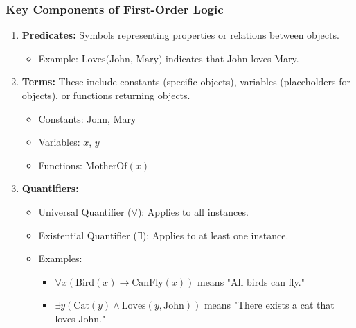 \documentclass[aspectratio=169]{beamer}
\begin{document}
\begin{frame}[fragile]
  \frametitle{Key Components of First-Order Logic}
  
  \begin{enumerate}
    \item \textbf{Predicates:} Symbols representing properties or relations between objects.
      \begin{itemize}
        \item Example: $\text{Loves(John, Mary)}$ indicates that John loves Mary.
      \end{itemize}
  
    \item \textbf{Terms:} 
      These include constants (specific objects), variables (placeholders for objects), or functions returning objects.
      \begin{itemize}
        \item Constants: John, Mary
        \item Variables: $x$, $y$
        \item Functions: $\text{MotherOf}(x)$
      \end{itemize}
  
    \item \textbf{Quantifiers:}
      \begin{itemize}
        \item Universal Quantifier ($\forall$): Applies to all instances.
        \item Existential Quantifier ($\exists$): Applies to at least one instance.
        \item Examples:
          \begin{itemize}
            \item $\forall x (\text{Bird}(x) \to \text{CanFly}(x))$ means "All birds can fly."
            \item $\exists y (\text{Cat}(y) \land \text{Loves}(y, \text{John}))$ means "There exists a cat that loves John."
          \end{itemize}
      \end{itemize}
  \end{enumerate}
\end{frame}
\end{document}
